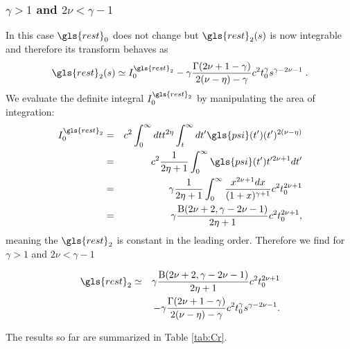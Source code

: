 \subsubsection{$\gamma>1$ and $2\nu<\gamma-1$}
In this case $\gls{rest}_0$ does not change but $\gls{rest}_2(s)$ is now integrable and therefore its transform behaves as
\begin{equation}
\gls{rest}_2(s) \simeq I^{\gls{rest}_2}_0 - \gamma \frac{\Gamma(2\nu+1-\gamma)}{2(\nu-\eta)-\gamma} c^2 t_0^\gamma s^{\gamma - 2\nu-1 } \; .
\end{equation}
We evaluate the definite integral $I^{\gls{rest}_2}_0$ by manipulating the area of integration:
\begin{eqnarray}
 I^{\gls{rest}_2}_0 &=& c^2\int_0^\infty dt  t^{2\eta} \int_t^\infty dt' \gls{psi}(t') (t')^{2(\nu-\eta)} \\
  &=& c^2\frac{1}{2\eta+1} \int_0^\infty \gls{psi}(t') t'^{2\nu+1} dt' \nonumber \\ 
 &=& \gamma\frac{1}{2\eta+1} \int_0^\infty \frac{x^{2\nu+1}dx}{(1+x)^{\gamma+1}}c^2 t_0^{2\nu+1}  \nonumber \\
&=& \gamma  \frac{\mathrm{B}(2\nu +2, \gamma - 2\nu -1)}{2\eta+1}  c^2 t_0^{2\nu+1} , 
\end{eqnarray}
meaning the $\gls{rest}_2$ is constant in the leading order. Therefore we find for $\gamma>1$ and $2\nu<\gamma-1$

\begin{eqnarray}
\gls{rest}_2 &\simeq & \gamma \frac{\mathrm{B}(2\nu +2, \gamma - 2\nu -1)}{2\eta+1}  c^2 t_0^{2\nu+1}   \nonumber \\
 & &  -\gamma \frac{\Gamma(2\nu+1-\gamma)} {2(\nu-\eta)-\gamma} c^2 t_0^\gamma  s^{\gamma - 2\nu-1} .
\end{eqnarray}

The results so far are summarized in Table \ref{tab:Cr}.


